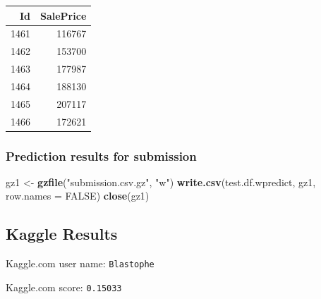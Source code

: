 \documentclass[]{article}
\newenvironment{Shaded}{\begin{snugshade}}{\end{snugshade}}
\newcommand{\KeywordTok}[1]{\textcolor[rgb]{0.13,0.29,0.53}{\textbf{{#1}}}}
\newcommand{\DataTypeTok}[1]{\textcolor[rgb]{0.13,0.29,0.53}{{#1}}}
\newcommand{\DecValTok}[1]{\textcolor[rgb]{0.00,0.00,0.81}{{#1}}}
\newcommand{\StringTok}[1]{\textcolor[rgb]{0.31,0.60,0.02}{{#1}}}
\newcommand{\OtherTok}[1]{\textcolor[rgb]{0.56,0.35,0.01}{{#1}}}
\newcommand{\NormalTok}[1]{{#1}}
\begin{document}
\begin{Shaded}
\end{Shaded}

\begin{longtable}[]{@{}rr@{}}
\toprule
Id & SalePrice\tabularnewline
\midrule
\endhead
1461 & 116767\tabularnewline
1462 & 153700\tabularnewline
1463 & 177987\tabularnewline
1464 & 188130\tabularnewline
1465 & 207117\tabularnewline
1466 & 172621\tabularnewline
\bottomrule
\end{longtable}

\subsubsection{Prediction results for
submission}\label{prediction-results-for-submission}

\begin{Shaded}
\begin{Highlighting}[]
\NormalTok{gz1 <-}\StringTok{ }\KeywordTok{gzfile}\NormalTok{(}\StringTok{"submission.csv.gz"}\NormalTok{, }\StringTok{"w"}\NormalTok{)}
\KeywordTok{write.csv}\NormalTok{(test.df.wpredict, gz1, }\DataTypeTok{row.names =} \OtherTok{FALSE}\NormalTok{)}
\KeywordTok{close}\NormalTok{(gz1)}
\end{Highlighting}
\end{Shaded}

\subsection{Kaggle Results}\label{kaggle-results}

Kaggle.com user name: \texttt{Blastophe}

Kaggle.com score: \texttt{0.15033}
\end{document}
